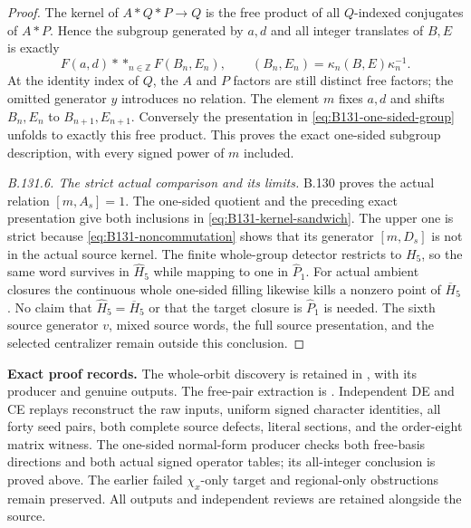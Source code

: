 \begin{proof}
The kernel of $A*Q*P\to Q$ is the free product of all $Q$-indexed
conjugates of $A*P$. Hence the subgroup generated by $a,d$ and all
integer translates of $B,E$ is exactly
\[
 F(a,d)*\mathop{*}_{n\in\mathbb Z}F(B_n,E_n),\qquad
 (B_n,E_n)=\kappa_n(B,E)\kappa_n^{-1}.
\]
At the identity index of $Q$, the $A$ and $P$ factors are still distinct free factors;
the omitted generator $y$ introduces no relation. The element $m$
fixes $a,d$ and shifts $B_n,E_n$ to $B_{n+1},E_{n+1}$. Conversely the
presentation in \eqref{eq:B131-one-sided-group} unfolds to exactly this
free product. This proves the exact one-sided subgroup description,
with every signed power of $m$ included.

\emph{B.131.6. The strict actual comparison and its limits.}
B.130 proves the actual relation $[m,A_s]=1$. The one-sided quotient
and the preceding exact presentation give both inclusions in
\eqref{eq:B131-kernel-sandwich}. The upper one is strict because
\eqref{eq:B131-noncommutation} shows that its generator $[m,D_s]$
is not in the actual source kernel.
The finite whole-group detector restricts to $H_5$, so the same word
survives in $\widehat H_5$ while mapping to one in $\widehat P_1$.
For actual ambient closures the continuous whole one-sided filling
likewise kills a nonzero point of $\overline H_5$. No claim that
$\widehat H_5=\overline H_5$ or that the target closure is
$\widehat P_1$ is needed. The sixth source generator $v$, mixed source
words, the full source presentation, and the selected centralizer
remain outside this conclusion.
\end{proof}

\begingroup\raggedright\footnotesize
\noindent\textbf{Exact proof records.}
The whole-orbit discovery is retained in
, with
its producer and genuine outputs. The free-pair extraction is
. Independent DE and CE
replays reconstruct the raw inputs, uniform signed character identities,
all forty seed pairs, both complete source defects, literal sections,
and the order-eight matrix witness. The one-sided normal-form producer
checks both free-basis directions and both actual signed operator tables;
its all-integer conclusion is proved above. The earlier failed
$\chi_x$-only target and regional-only obstructions remain preserved.
All outputs and independent reviews are retained alongside the source.
\par\endgroup
